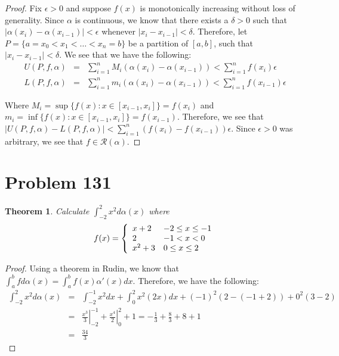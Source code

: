 \documentclass[psamsfonts]{amsart}
\newtheorem{thm}{Theorem}[section]
\theoremstyle{definition}
\theoremstyle{remark}
\numberwithin{equation}{section}
\begin{document}
\begin{proof}
Fix $\epsilon > 0$ and suppose $f(x)$ is monotonically increasing without loss of generality. Since $\alpha$ is continuous, we know that there exists a $\delta > 0$ such that $|\alpha(x_i) - \alpha(x_{i-1}) | < \epsilon$ whenever $|x_i - x_{i-1} | < \delta$. Therefore, let $P = \{ a = x_0 < x_1 < \ldots < x_n = b \}$ be a partition of $[a,b]$, such that $|x_i - x_{i-1} | < \delta$. We see that we have the following:
\begin{eqnarray}
U(P,f,\alpha) &=& \sum_{i=1}^n M_i (\alpha(x_i) - \alpha(x_{i-1})) < \sum_{i=1}^n f(x_i) \epsilon \\
L(P,f,\alpha) &=& \sum_{i=1}^n m_i (\alpha(x_i) - \alpha(x_{i-1})) < \sum_{i=1}^n f(x_{i-1}) \epsilon
\end{eqnarray}

Where $M_i = \sup \{ f(x): x \in [x_{i-1},x_i] \} = f(x_i)$ and $m_i = \inf \{ f(x): x \in [x_{i-1},x_i] \} = f(x_{i-1})$. Therefore, we see that $|U(P,f,\alpha) - L(P,f,\alpha)| < \sum_{i=1}^n (f(x_i) - f(x_{i-1})) \epsilon$. Since $\epsilon > 0$ was arbitrary, we see that $f \in \mathscr{R}(\alpha)$. 
\end{proof}

\section{Problem 131}

\begin{thm}
Calculate $\int_{-2}^2 x^2 d \alpha(x)$ where
\begin{eqnarray}
f(x) = \left\{ \begin{array}{l l}
x+2 & -2 \leq x \leq -1 \\
2 & -1 < x < 0 \\
x^2 + 3 & 0 \leq x \leq 2 
\end{array} \right.
\end{eqnarray}
\end{thm}

\begin{proof}
Using a theorem in Rudin, we know that $\int_a^b f d \alpha(x) = \int_a^b f(x) \alpha'(x) dx$. Therefore, we have the following:
\begin{eqnarray}
\int_{-2}^2 x^2 d \alpha(x) &=& \int_{-2}^{-1} x^2 dx + \int_0^2 x^2 (2x) dx + (-1)^2 (2 - (-1 + 2)) + 0^2 (3 - 2) \\
&=& \left. \frac{x^3}{3} \right|^{-1}_{-2} + \left. \frac{x^4}{2} \right|^2_0 + 1 = -\frac{1}{3}+ \frac{8}{3} + 8 + 1  \\
&=& \frac{34}{3}  
\end{eqnarray}
\end{proof}
\end{document}
